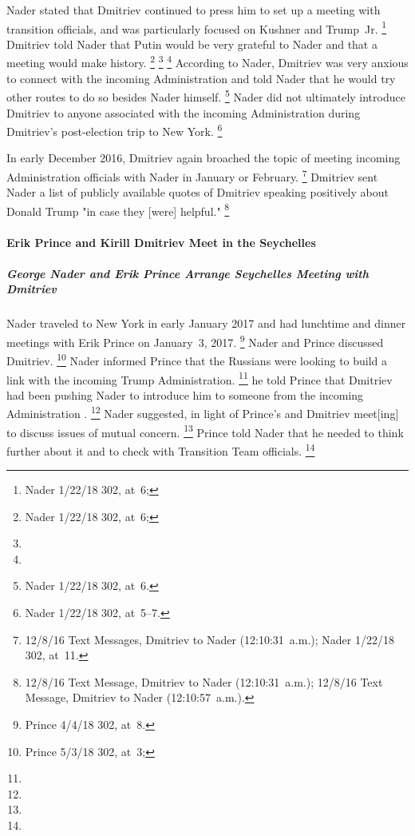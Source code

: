 Nader stated that Dmitriev continued to press him to set up a meeting with transition officials, and was particularly focused on Kushner and Trump~Jr.%
\footnote{Nader 1/22/18 302, at~6;
}
Dmitriev told Nader that Putin would be very grateful to Nader and that a meeting would make history.%
\footnote{Nader 1/22/18 302, at~6;
}
\footnote{}
\footnote{}
According to Nader, Dmitriev was very anxious to connect with the incoming Administration and told Nader that he would try other routes to do so besides Nader himself.%
\footnote{Nader 1/22/18 302, at~6.}
Nader did not ultimately introduce Dmitriev to anyone associated with the incoming Administration during Dmitriev's post-election trip to New York.%
\footnote{Nader 1/22/18 302, at~5--7.}

In early December 2016, Dmitriev again broached the topic of meeting incoming Administration officials with Nader in January or February.%
\footnote{12/8/16 Text Messages, Dmitriev to Nader (12:10:31~a.m.);
Nader 1/22/18 302, at~11.}
Dmitriev sent Nader a list of publicly available quotes of Dmitriev speaking positively about Donald Trump "in case they [were] helpful."%
\footnote{12/8/16 Text Message, Dmitriev to Nader (12:10:31~a.m.);
12/8/16 Text Message, Dmitriev to Nader (12:10:57~a.m.).}

\paragraph{Erik Prince and Kirill Dmitriev Meet in the Seychelles}

\subparagraph{George Nader and Erik Prince Arrange Seychelles Meeting with Dmitriev}

Nader traveled to New York in early January 2017 and had lunchtime and dinner meetings with Erik Prince on January~3, 2017.%
\footnote{Prince 4/4/18 302, at~8.}
Nader and Prince discussed Dmitriev.%
\footnote{Prince 5/3/18 302, at~3; }
Nader informed Prince that the Russians were looking to build a link with the incoming Trump Administration.%
\footnote{}
he told Prince that Dmitriev had been pushing Nader to introduce him to someone from the incoming Administration
.%
\footnote{}
Nader suggested, in light of Prince's and Dmitriev meet[ing] to discuss issues of mutual concern.%
\footnote{}
Prince told Nader that he needed to think further about it and to check with Transition Team officials.%
\footnote{}

